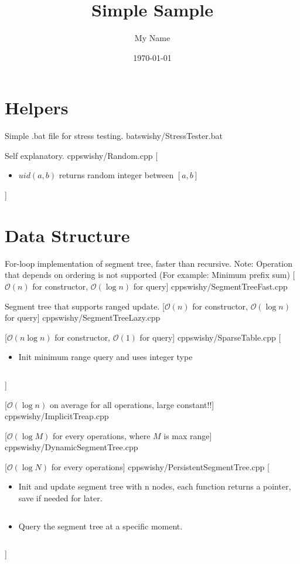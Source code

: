 \documentclass[10pt,a4paper,oneside,twocolumn]{article}
\title{Simple Sample} %
\author{My Name} %
\date{\today} %
\newcommand{\currentsectiontitle}{}
\newcommand{\msection}[1]{\section{#1}\gdef\currentsectiontitle{#1}}
\begin{document}
\tableofcontents


\msection{Helpers}

{Simple .bat file for stress testing.}
{bat}{swishy/StressTester.bat}

{Self explanatory.}
{cpp}{swishy/Random.cpp}
[
\begin{itemize} 
    \item {$uid(a, b)$ returns random integer between $[a, b]$}
\end{itemize}
]

\msection{Data Structure}
{For-loop implementation of segment tree, faster than recursive. Note: Operation that depends on ordering is not supported (For example: Minimum prefix sum)}
[$\mathcal{O}(n)$ for constructor, $\mathcal{O}(\log n)$ for query]
{cpp}{swishy/SegmentTreeFast.cpp}

{Segment tree that supports ranged update.}
[$\mathcal{O}(n)$ for constructor, $\mathcal{O}(\log n)$ for query]
{cpp}{swishy/SegmentTreeLazy.cpp}

[$\mathcal{O}(n\log n)$ for constructor, $\mathcal{O}(1)$ for query]
{cpp}{swishy/SparseTable.cpp}
[
    \begin{itemize}
        \item Init minimum range query and uses integer type \inputminted{cpp}{swishy/examples/SparseTable.cpp}
    \end{itemize}
]

[$\mathcal{O}(\log n)$ on average for all operations, large constant!!]
{cpp}{swishy/ImplicitTreap.cpp}

[$\mathcal{O}(\log M)$ for every operations, where $M$ is max range]
{cpp}{swishy/DynamicSegmentTree.cpp}

[$\mathcal{O}(\log N)$ for every operations]
{cpp}{swishy/PersistentSegmentTree.cpp}
[
    \begin{itemize}
        \item Init and update segment tree with n nodes, each function returns a pointer, save if needed for later. \inputminted{cpp}{swishy/examples/PersistentSegmentTree1.cpp}
        \item Query the segment tree at a specific moment. \inputminted{cpp}{swishy/examples/PersistentSegmentTree2.cpp}
    \end{itemize}
]
\end{document}
